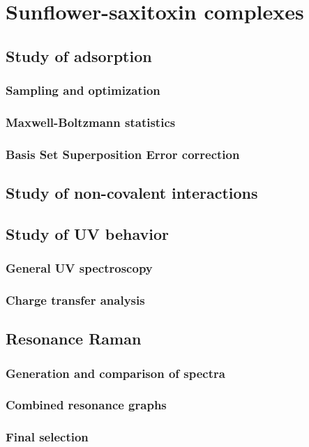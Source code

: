 \setchapterpreamble[u]{\margintoc}
\chapter{Sunflower-saxitoxin complexes}


\section{Study of adsorption}

\subsection{Sampling and optimization}

\subsection{Maxwell-Boltzmann statistics}

\subsection{Basis Set Superposition Error correction}


\section{Study of non-covalent interactions}


\section{Study of UV behavior}

\subsection{General UV spectroscopy}

\subsection{Charge transfer analysis}


\section{Resonance Raman}

\subsection{Generation and comparison of spectra}

\subsection{Combined resonance graphs}

\subsection{Final selection}

\blindtext
